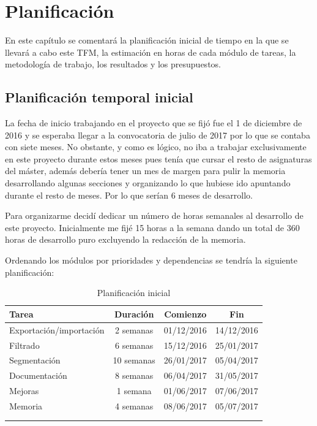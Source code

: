 \chapter{Planificación}

En este capítulo se comentará la planificación inicial de tiempo en la que se llevará a cabo este TFM, la estimación en horas de cada módulo de tareas, la metodología de trabajo, los resultados y los presupuestos.

\section{Planificación temporal inicial}

La fecha de inicio trabajando en el proyecto que se fijó fue el 1 de diciembre de 2016 y se esperaba llegar a la convocatoria de julio de 2017 por lo que se contaba con siete meses. No obstante, y como es lógico, no iba a trabajar exclusivamente en este proyecto durante estos meses pues tenía que cursar el resto de asignaturas del máster, además debería tener un mes de margen para pulir la memoria desarrollando algunas secciones y organizando lo que hubiese ido apuntando durante el resto de meses. Por lo que serían 6 meses de desarrollo.

Para organizarme decidí dedicar un número de horas semanales al desarrollo de este proyecto. Inicialmente me fijé 15 horas a la semana dando un total de 360 horas de desarrollo puro excluyendo la redacción de la memoria.

Ordenando los módulos por prioridades y dependencias se tendría la siguiente planificación:

\begin{longtable} {l c c c}
	\hline
	\textbf{Tarea}			&	\textbf{Duración}	&	\textbf{Comienzo}	&	\textbf{Fin}	\\
	\hline \hline
	\endhead
	\hline 
	Exportación/importación	&	2 semanas			&	01/12/2016			&	14/12/2016		\\
	\hline
	Filtrado				&	6 semanas			&	15/12/2016			&	25/01/2017		\\
	\hline
	Segmentación			&	10 semanas			&	26/01/2017			&	05/04/2017		\\
	\hline
	Documentación			&	8 semanas			&	06/04/2017			&	31/05/2017		\\
	\hline
	Mejoras					&	1 semana			&	01/06/2017			&	07/06/2017		\\
	\hline
	Memoria					&	4 semanas			&	08/06/2017			&	05/07/2017		\\
	\hline
	\\
	\caption{Planificación inicial}
	\label{tab:planificacion/planificacion-inicial}
\end{longtable}

